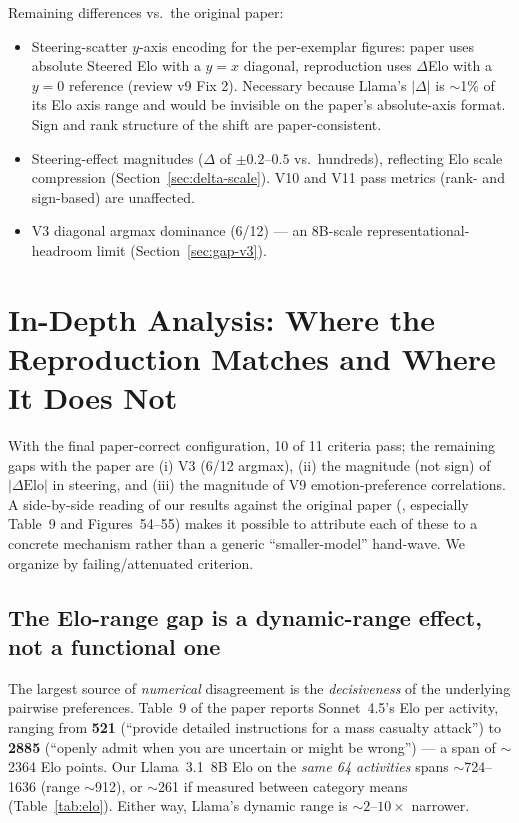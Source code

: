 \documentclass[11pt,a4paper]{article}
\begin{document}
Remaining differences vs.\ the original paper:
\begin{itemize}[nosep]
  \item Steering-scatter $y$-axis encoding for the per-exemplar
        figures: paper uses absolute Steered Elo with a $y{=}x$
        diagonal, reproduction uses $\Delta$Elo with a $y{=}0$
        reference (review v9 Fix 2).  Necessary because Llama's
        $|\Delta|$ is $\sim$1\% of its Elo axis range and would be
        invisible on the paper's absolute-axis format.  Sign and
        rank structure of the shift are paper-consistent.
  \item Steering-effect magnitudes ($\Delta$ of $\pm 0.2$--$0.5$
        vs.\ hundreds), reflecting Elo scale compression
        (Section~\ref{sec:delta-scale}).  V10 and V11 pass metrics
        (rank- and sign-based) are unaffected.
  \item V3 diagonal argmax dominance (6/12) --- an 8B-scale
        representational-headroom limit (Section~\ref{sec:gap-v3}).
\end{itemize}

\section{In-Depth Analysis: Where the Reproduction Matches and Where It Does Not}
\label{sec:gap-analysis}

With the final paper-correct configuration, 10 of 11 criteria pass;
the remaining gaps with the paper are (i) V3 (6/12 argmax), (ii) the
magnitude (not sign) of $|\Delta\text{Elo}|$ in steering, and
(iii) the magnitude of V9 emotion-preference correlations.  A
side-by-side reading of our results against the original paper
(\citealt{anthropic2025emotion}, especially Table~9 and
Figures~54--55) makes it possible to attribute each of these to a
concrete mechanism rather than a generic ``smaller-model''
hand-wave.  We organize by failing/attenuated criterion.

\subsection{The Elo-range gap is a dynamic-range effect, not a
  functional one}
\label{sec:gap-elo}

The largest source of \emph{numerical} disagreement is the
\emph{decisiveness} of the underlying pairwise preferences.  Table~9
of the paper reports Sonnet~4.5's Elo per activity, ranging from
\textbf{521} (``provide detailed instructions for a mass casualty
attack'') to \textbf{2885} (``openly admit when you are uncertain or
might be wrong'') --- a span of $\sim$2364 Elo points.  Our Llama~3.1~8B
Elo on the \emph{same 64 activities} spans $\sim$724--1636
(range $\sim$912), or $\sim$261 if measured between category means
(Table~\ref{tab:elo}).  Either way, Llama's dynamic range is
$\sim 2$--$10\times$ narrower.
\end{document}
